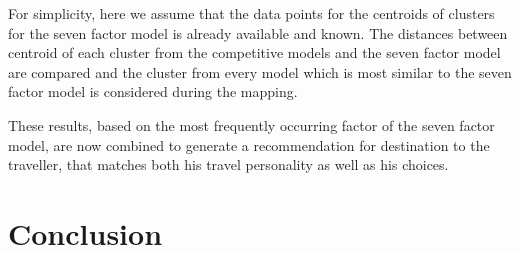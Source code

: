 For simplicity, here we assume that the data points for the centroids of clusters for the seven factor model \cite{sertkan2018mapping} is already available and known. The distances between centroid of each cluster from  the competitive models and the seven factor model are compared and the cluster from every model which is most similar to the seven factor model is considered during the mapping. 

These results, based on the most frequently occurring factor of the seven factor model, are now combined to generate a recommendation for destination to the traveller, that matches both his travel personality as well as his choices.
\section{Conclusion}



